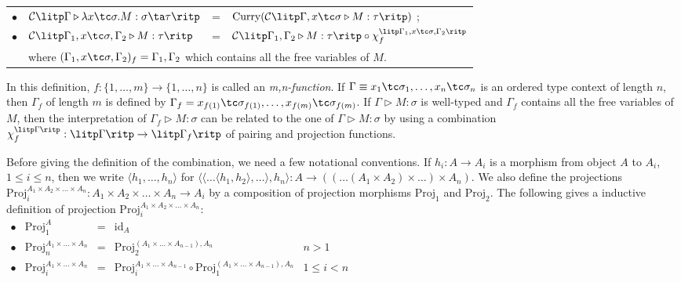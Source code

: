 \begin{definition}
\begin{myitemize}
\begin{tabular}{rlcl}
  $ \bullet $ & $ \mathcal{C} \litp \Gamma \triangleright \lambda x \tc \sigma .M: \sigma \ta \tau \ritp $ & = & $ \text{Curry}( \mathcal{C} \litp \Gamma , x \tc \sigma \triangleright M: \tau \ritp ) $ ; \\[5pt]
  $ \bullet $ & $ \mathcal{C} \litp \Gamma _1 , x \tc \sigma , \Gamma _2 \triangleright M: \tau \ritp $ & = & $ \mathcal{C} \litp \Gamma _1 , \Gamma _2 \triangleright M: \tau \ritp \circ \chi_f^{\litp \Gamma _1 , x \tc \sigma , \Gamma _2 \ritp} $ \\[5pt]
  & \multicolumn{3}{l}{where $ ( \Gamma _1 , x \tc \sigma , \Gamma _2 )_f = \Gamma _1 , \Gamma _2 $ which contains all the free variables of $ M $.} \\[5pt]
  \end{tabular}
\end{myitemize}
\end{definition}

In this definition, $ f: \{ 1, \ldots , m \} \to \{ 1, \ldots , n \} $ is called an \emph{m,n-function}. If $ \Gamma \equiv x_1 \tc \sigma_1, \ldots , x_n \tc \sigma_n $ is an ordered type context of length $ n $, then $ \Gamma_f $ of length $ m $ is defined by $ \Gamma_f = x_{f(1)} \tc \sigma_{f(1)}, \ldots , x_{f(m)} \tc \sigma_{f(m)} $. If $ \Gamma \triangleright M: \sigma $ is well-typed and $ \Gamma_f $ contains all the free variables of $ M $, then the interpretation of $ \Gamma_f \triangleright M: \sigma $ can be related to the one of $ \Gamma \triangleright M: \sigma $ by using a combination $ \chi_f^{\litp \Gamma \ritp} : \litp \Gamma \ritp \to \litp \Gamma_f \ritp $ of pairing and projection functions.

Before giving the definition of the combination, we need a few notational conventions. If $ h_i:A \to A_i $ is a morphism from object $ A $ to $ A_i $, $ 1 \leq i \leq n $, then we write $ \langle h_1, \ldots , h_n \rangle $ for $ \langle \langle \ldots \langle h_1,h_2 \rangle, \ldots \rangle , h_n \rangle : A \to (( \ldots (A_1 \times A_2) \times \ldots ) \times A_n ) $. We also define the projections $ \text{Proj}_i^{A_1 \times A_2 \times \ldots \times A_n} : A_1 \times A_2 \times \ldots \times A_n \to A_i $ by a composition of projection morphisms $ \text{Proj}_1 $ and $ \text{Proj}_2 $. The following gives a inductive definition of projection $ \text{Proj}_i^{A_1 \times A_2 \times \ldots \times A_n} $:\\[5pt]
$
\begin{array}{rlcll}
\bullet & \text{Proj}_1^{A} & = & \text{id}_A & \\[5pt]
\bullet & \text{Proj}_n^{A_1 \times \ldots \times A_n} & = & \text{Proj}_2^{(A_1 \times \ldots \times A_{n-1}), A_n} & n > 1 \\[5pt]
\bullet & \text{Proj}_i^{A_1 \times \ldots \times A_n} & = & \text{Proj}_i^{A_1 \times \ldots \times A_{n-1}} \circ \text{Proj}_1^{(A_1 \times \ldots \times A_{n-1}), A_n} & 1 \leq i < n \\[10pt]
\end{array}
$

